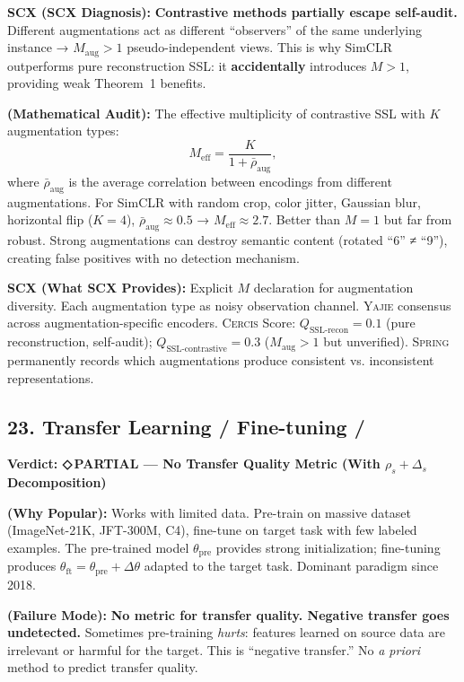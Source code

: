 \documentclass[12pt,a4paper]{article}
\theoremstyle{definition}
\newcommand{\weakness}{{\color{weakcolor}\textbf{◇\,PARTIAL}}}
\newcommand{\Yajie}{\textsc{Yajie}}
\newcommand{\Spring}{\textsc{Spring}}
\newcommand{\Cercis}{\textsc{Cercis}}
\newcommand{\auditHeader}[1]{\medskip\noindent\textbf{\large #1}\medskip}
\newcommand{\whyPopular}{\noindent\textbf{ (Why Popular):} }
\newcommand{\whyFail}{\noindent\textbf{ (Failure Mode):} }
\newcommand{\whatMissing}{\noindent\textbf{SCX (What SCX Provides):} }
\newcommand{\diagnosis}{\noindent\textbf{SCX (SCX Diagnosis):} }
\newcommand{\mathAudit}{\noindent\textbf{ (Mathematical Audit):} }
\begin{document}
\diagnosis{} \textbf{Contrastive methods partially escape self-audit.} Different augmentations act as different ``observers'' of the same underlying instance → $M_{\text{aug}} > 1$ pseudo-independent views. This is why SimCLR outperforms pure reconstruction SSL: it \textbf{accidentally} introduces $M>1$, providing weak Theorem~1 benefits.

\mathAudit{} The effective multiplicity of contrastive SSL with $K$ augmentation types:
\[
M_{\text{eff}} = \frac{K}{1 + \bar{\rho}_{\text{aug}}},
\]
where $\bar{\rho}_{\text{aug}}$ is the average correlation between encodings from different augmentations. For SimCLR with random crop, color jitter, Gaussian blur, horizontal flip ($K=4$), $\bar{\rho}_{\text{aug}} \approx 0.5$ → $M_{\text{eff}} \approx 2.7$. Better than $M=1$ but far from robust. Strong augmentations can destroy semantic content (rotated ``6'' ≠ ``9''), creating false positives with no detection mechanism.

\whatMissing{} Explicit $M$ declaration for augmentation diversity. Each augmentation type as noisy observation channel. \Yajie{} consensus across augmentation-specific encoders. \Cercis{} Score: $Q_{\text{SSL-recon}} = 0.1$ (pure reconstruction, self-audit); $Q_{\text{SSL-contrastive}} = 0.3$ ($M_{\text{aug}}>1$ but unverified). \Spring{} permanently records which augmentations produce consistent vs. inconsistent representations.

\subsection{23. Transfer Learning / Fine-tuning /}

\auditHeader{Verdict: \weakness{} — No Transfer Quality Metric (With $\rho_s + \Delta_s$ Decomposition)}

\whyPopular{} Works with limited data. Pre-train on massive dataset (ImageNet-21K, JFT-300M, C4), fine-tune on target task with few labeled examples. The pre-trained model $\theta_{\text{pre}}$ provides strong initialization; fine-tuning produces $\theta_{\text{ft}} = \theta_{\text{pre}} + \Delta\theta$ adapted to the target task. Dominant paradigm since 2018.

\whyFail{} \textbf{No metric for transfer quality. Negative transfer goes undetected.} Sometimes pre-training \textit{hurts}: features learned on source data are irrelevant or harmful for the target. This is ``negative transfer.'' No \textit{a priori} method to predict transfer quality.
\end{document}

